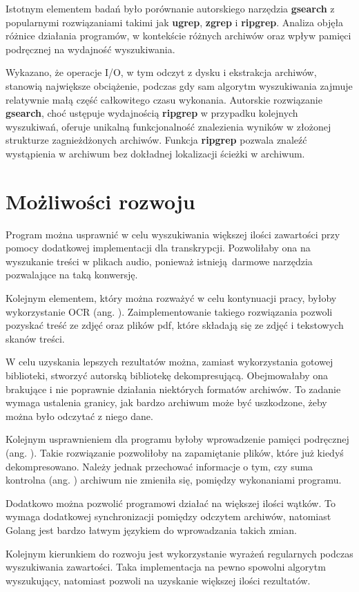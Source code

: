 Istotnym elementem badań było porównanie autorskiego narzędzia \textbf{gsearch} z 
popularnymi rozwiązaniami takimi jak \textbf{ugrep}, \textbf{zgrep} i 
\textbf{ripgrep}. Analiza objęła 
różnice działania programów, w kontekście różnych archiwów oraz wpływ pamięci
podręcznej na wydajność wyszukiwania. 

Wykazano, że operacje I/O, w tym odczyt z dysku i ekstrakcja archiwów, stanowią największe
obciążenie, podczas gdy sam algorytm wyszukiwania zajmuje relatywnie małą część
całkowitego czasu wykonania. Autorskie rozwiązanie \textbf{gsearch}, choć ustępuje
wydajnością \textbf{ripgrep} w przypadku kolejnych wyszukiwań, oferuje unikalną 
funkcjonalność znalezienia wyników w złożonej strukturze zagnieżdżonych archiwów.
Funkcja \textbf{ripgrep} pozwala znaleźć wystąpienia w archiwum bez dokładnej
lokalizacji ścieżki w archiwum.

\section{Możliwości rozwoju}

Program można usprawnić w celu wyszukiwania większej ilości zawartości przy
pomocy dodatkowej implementacji dla transkrypcji. Pozwoliłaby ona na wyszukanie
treści w plikach audio, ponieważ istnieją darmowe narzędzia pozwalające na taką
konwersję.

Kolejnym elementem, który można rozważyć w celu kontynuacji pracy, byłoby 
wykorzystanie OCR (ang. ). Zaimplementowanie
takiego rozwiązania pozwoli pozyskać treść ze zdjęć oraz plików pdf, które składają 
się ze zdjęć i tekstowych skanów treści.

W celu uzyskania lepszych rezultatów można, zamiast wykorzystania gotowej 
biblioteki, stworzyć autorską bibliotekę dekompresującą. Obejmowałaby ona 
brakujące i nie poprawnie działania niektórych formatów archiwów. To zadanie
wymaga ustalenia granicy, jak bardzo archiwum może być uszkodzone, żeby można
było odczytać z niego dane.

Kolejnym usprawnieniem dla programu byłoby wprowadzenie pamięci podręcznej (ang. ).
Takie rozwiązanie pozwoliłoby na zapamiętanie plików, które już kiedyś dekompresowano.
Należy jednak przechować informacje o tym, czy suma kontrolna (ang. )
archiwum nie zmieniła się, pomiędzy wykonaniami programu.

Dodatkowo można pozwolić programowi działać na większej ilości wątków. To 
wymaga dodatkowej synchronizacji pomiędzy odczytem archiwów, natomiast
Golang jest bardzo łatwym językiem do wprowadzania takich zmian.

Kolejnym kierunkiem do rozwoju jest wykorzystanie wyrażeń regularnych podczas
wyszukiwania zawartości. Taka implementacja na pewno spowolni algorytm 
wyszukujący, natomiast pozwoli na uzyskanie większej ilości rezultatów.